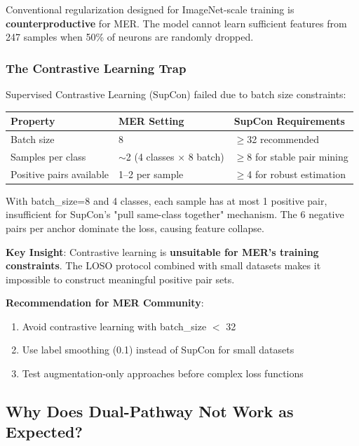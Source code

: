 \documentclass[preprint,12pt,authoryear]{elsarticle}
\begin{document}
Conventional regularization designed for ImageNet-scale training is \textbf{counterproductive} for MER. The model cannot learn sufficient features from 247 samples when 50\% of neurons are randomly dropped.

\subsubsection{The Contrastive Learning Trap}

Supervised Contrastive Learning (SupCon) \cite{khosla2020supervised} failed due to batch size constraints:

\begin{table}[htbp]
\centering
\begin{tabular}{lll}
\toprule
\textbf{Property} & \textbf{MER Setting} & \textbf{SupCon Requirements} \\
\midrule
Batch size & 8 & $\geq$32 recommended \\
Samples per class & $\sim$2 (4 classes $\times$ 8 batch) & $\geq$8 for stable pair mining \\
Positive pairs available & 1--2 per sample & $\geq$4 for robust estimation \\
\bottomrule
\end{tabular}
\end{table}

With batch\_size=8 and 4 classes, each sample has at most 1 positive pair, insufficient for SupCon's "pull same-class together" mechanism. The 6 negative pairs per anchor dominate the loss, causing feature collapse.

\textbf{Key Insight}: Contrastive learning is \textbf{unsuitable for MER's training constraints}. The LOSO protocol combined with small datasets makes it impossible to construct meaningful positive pair sets.

\textbf{Recommendation for MER Community}:
\begin{enumerate}
\item Avoid contrastive learning with batch\_size $<$ 32
\item Use label smoothing (0.1) instead of SupCon for small datasets
\item Test augmentation-only approaches before complex loss functions
\end{enumerate}

\subsection{Why Does Dual-Pathway Not Work as Expected?}
\end{document}

